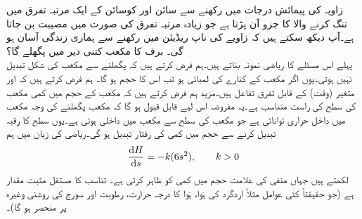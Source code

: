 زاویہ کی پیمائش درجات میں رکھنے سے سائن اور کوسائن کے ایک مرتبہ   تفرق میں تنگ کرنے والا  کا جزو آن پڑتا ہے جو زیادہ مرتبہ تفرق کی صورت میں مصیبت بن  جاتا ہے۔آپ دیکھ سکتے ہیں کہ زاویے  کی ناپ ریڈیئن میں رکھنے سے ہماری  زندگی  آسان ہو گی۔
برف کا مکعب کتنی دیر میں پگھلے گا؟\\
پہلے اس مسئلے کا ریاضی نمونہ بناتے ہیں۔ہم فرض کرتے ہیں کہ پگھلنے سے مکعب کی شکل تبدیل نہیں ہوتی۔یوں اگر مکعب کے کنارے کی لمبائی  ہو تب اس کا حجم  ہو گا۔ ہم فرض کرتے ہیں کہ  اور  متغیر  (وقت) کے قابل تفرق تفاعل ہیں۔مزید ہم فرض کرتے ہیں کہ مکعب کے حجم میں کمی  مکعب کی سطح کی راست متناسب ہے۔یہ مفروضہ اس لیے قابل قبول ہو گا کہ مکعب پگھلنے کی وجہ مکعب میں داخل حراری توانائی ہے جو مکعب کی سطح سے مکعب میں داخلی ہوتی ہے۔یوں سطح کا رقبہ تبدیل کرنے سے حجم میں کمی کی رفتار تبدیل ہو گی۔ریاضی کی زبان میں ہم
\begin{align*}
\frac{\dif H}{\dif s}=-k(6s^2),\quad\quad k>0
\end{align*}
لکھتے ہیں جہاں منفی کی علامت حجم میں کمی کو ظاہر کرتی ہے۔ تناسب کا مستقل  مثبت مقدار ہے (جو حقیقتاً کئی عوامل مثلاً  اردگرد کی ہَوا، ہَوا کا درجہ حرارت، رطوبت اور سورج کی روشنی وغیرہ پر منحصر ہو گا)۔

